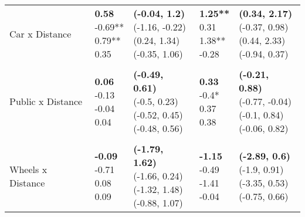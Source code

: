 \begin{table}
\begin{center}
\begin{small}
\begin{tabular}{lllll}
\quad Car x Distance    &  \makecell[l]{\textbf{0.58} \\-0.69** \\0.79** \\0.35 \\}   &  \makecell[l]{\textbf{(-0.04, 1.2)} \\(-1.16, -0.22) \\(0.24, 1.34) \\(-0.35, 1.06) \\}   &  \makecell[l]{\textbf{1.25**} \\0.31 \\1.38** \\-0.28 \\}   &  \makecell[l]{\textbf{(0.34, 2.17)} \\(-0.37, 0.98) \\(0.44, 2.33) \\(-0.94, 0.37) \\} \\ 
& & & & \\ 
\quad Public x Distance    &  \makecell[l]{\textbf{0.06} \\-0.13 \\-0.04 \\0.04 \\}   &  \makecell[l]{\textbf{(-0.49, 0.61)} \\(-0.5, 0.23) \\(-0.52, 0.45) \\(-0.48, 0.56) \\}   &  \makecell[l]{\textbf{0.33} \\-0.4* \\0.37 \\0.38 \\}   &  \makecell[l]{\textbf{(-0.21, 0.88)} \\(-0.77, -0.04) \\(-0.1, 0.84) \\(-0.06, 0.82) \\} \\ 
& & & & \\ 
\quad Wheels x Distance    &  \makecell[l]{\textbf{-0.09} \\-0.71 \\0.08 \\0.09 \\}   &  \makecell[l]{\textbf{(-1.79, 1.62)} \\(-1.66, 0.24) \\(-1.32, 1.48) \\(-0.88, 1.07) \\}   &  \makecell[l]{\textbf{-1.15} \\-0.49 \\-1.41 \\-0.04 \\}   &  \makecell[l]{\textbf{(-2.89, 0.6)} \\(-1.9, 0.91) \\(-3.35, 0.53) \\(-0.75, 0.66) \\} \\ 

\end{tabular}
\end{small}
\end{center}
\end{table}
